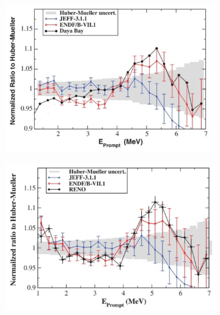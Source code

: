 \begin{figure}[!h]
\centering
\begin{subfigure}{.48\textwidth}
  \centering
  \includegraphics[width=\linewidth]{Chapter2/Figs/Raster/huberMueller_DayaBay_Rmills2015.png}
  \captionsetup{width=.9\linewidth}
  \caption{}
  \label{subFig:DayaBay5MevBump}
\end{subfigure}%
\begin{subfigure}{.48\textwidth}
  \centering
\includegraphics[width=\linewidth]{Chapter2/Figs/Raster/huberMueller_Reno_Rmills2015.png}
  \captionsetup{width=.9\linewidth}
  \caption{}
  \label{subFig:Reno5MevBump}
\end{subfigure}
\begin{subfigure}{.48\textwidth}
  \centering

\end{subfigure}
\end{figure}
